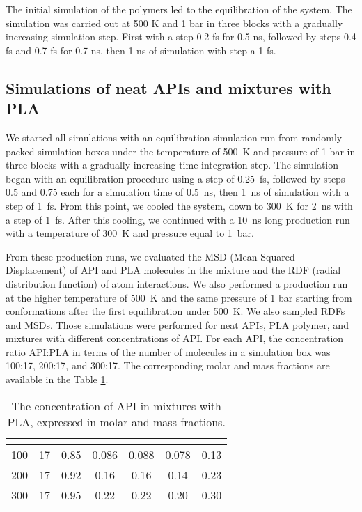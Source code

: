 The initial simulation of the polymers led to the equilibration of the system. The simulation was carried out at 500 K and 1 bar in three blocks with a gradually increasing simulation step. First with a step 0.2 fs for 0.5 ns, followed by steps 0.4 fs and 0.7 fs for 0.7 ns, then 1 ns of simulation with step a 1 fs. 





\subsection{Simulations of neat APIs and mixtures with PLA}
We started all simulations with an equilibration simulation run from randomly packed simulation boxes under the temperature of 500~K and pressure of 1 bar in three blocks with a gradually increasing time-integration step. The simulation began with an equilibration procedure using a step of 0.25~fs, followed by steps 0.5 and 0.75 each for a simulation time of 0.5~ns, then 1~ns of simulation with a step of 1~fs. From this point, we cooled the system, down to 300~K for 2~ns with a step of 1~fs. After this cooling, we continued with a 10~ns long production run with a temperature of 300~K and pressure equal to 1~bar.

From these production runs, we evaluated the MSD (Mean Squared Displacement) of API and PLA molecules in the mixture and the RDF (radial distribution function) of atom interactions. We also performed a production run at the higher temperature of 500~K and the same pressure of 1 bar starting from conformations after the first equilibration under 500~K. We also sampled RDFs and MSDs. Those simulations were performed for neat APIs, PLA polymer, and mixtures with different concentrations of API. For each API, the concentration ratio API:PLA in terms of the number of molecules in a simulation box was 100:17, 200:17, and 300:17. The corresponding molar and mass fractions are available in the Table \ref{tab:fractions}.

\begin{table}[h]
	\centering
	\caption{The concentration of API in mixtures with PLA, expressed in molar and mass fractions.}
	\begin{tabular}{ccccccc}
		\toprule
		{\textbf{\boldmath{$N_{\text{API}}$}}} &
		{\textbf{\boldmath{$N_{\text{PLA}}$}}} &
		{\textbf{\boldmath{$x_{\text{API}}$}}} & {\textbf{\boldmath{$w_{\text{nap}}$}}} & {\textbf{\boldmath{$w_{\text{cbz}}$}}} & {\textbf{\boldmath{$w_{\text{ibu}}$}}} & {\textbf{\boldmath{$w_{\text{indo}}$}}} \\
		\midrule
		100 & 17 & 0.85 & 0.086 & 0.088 & 0.078 & 0.13 \\
		200 & 17 & 0.92 & 0.16 & 0.16 & 0.14 & 0.23 \\
		300 & 17 & 0.95 & 0.22 & 0.22 & 0.20 & 0.30 \\
		\bottomrule
	\end{tabular}
	\label{tab:fractions}
\end{table} 

